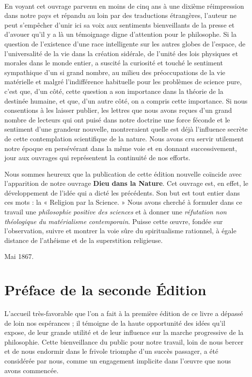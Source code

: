 \documentclass[a4paper, 11pt, oneside, landscape]{article}
\begin{document}
\paragraph{}
En voyant cet ouvrage parvenu en moins de cinq ans à une dixième réimpression dans notre pays et répandu au loin par des traductions étrangères, l'auteur ne peut s'empêcher d'unir ici sa voix aux sentiments bienveillants de la presse et d'avouer qu'il y a là un témoignage digne d'attention pour le philosophe. Si la question de l'existence d'une race intelligente sur les autres globes de l'espace, de l'universalité de la vie dans la création sidérale, de l'unité des lois physiques et morales dans le monde entier, a suscité la curiosité et touché le sentiment sympathique d'un si grand nombre, au milieu des préoccupations de la vie matérielle et malgré l'indifférence habituelle pour les problèmes de science pure, c'est que, d'un côté, cette question a son importance dans la théorie de la destinée humaine, et que, d'un autre côté, on a compris cette importance. Si nous consentions à les laisser publier, les lettres que nous avons reçues d'un grand nombre de lecteurs qui ont puisé dans notre doctrine une force féconde et le sentiment d'une grandeur nouvelle, montreraient quelle est déjà l'influence secrète de cette contemplation scientifique de la nature. Nous avons cru servir utilement notre époque en persévérant dans la même voie et en donnant successivement, jour aux ouvrages qui représentent la continuité de nos efforts.

Nous sommes heureux que la publication de cette édition nouvelle coïncide avec l'apparition de notre ouvrage \textbf{Dieu dans la Nature}. Cet ouvrage est, en effet, le développement de l'idée qui a dicté les précédents. Son but est tout entier dans ces mots : la « Religion par la Science. » Nous avons cherché à formuler dans ce travail une \emph{philosophie positive des sciences} et à donner une \emph{réfutation non théologique du matérialisme contemporain}. Puisse cette œuvre, fondée sur l'observation, suivre et montrer la voie sûre du spiritualisme rationnel, à égale distance de l'athéisme et de la superstition religieuse.

\bigskip

Mai 1867.
\clearpage
\section*{Préface de la seconde Édition}
\paragraph{}
L'accueil très-favorable que l'on a fait à la première édition de ce livre a dépassé de loin nos espérances ; il témoigne de la haute opportunité des idées qu'il expose, de leur grande utilité et de leur influence sur la marche progressive de la philosophie. Cette bienveillance du public pour notre travail, loin de nous bercer et de nous endormir dans le frivole triomphe d'un succès passager, a été considérée par nous, comme un engagement implicite dans l'œuvre que nous avons commencée.
\end{document}
